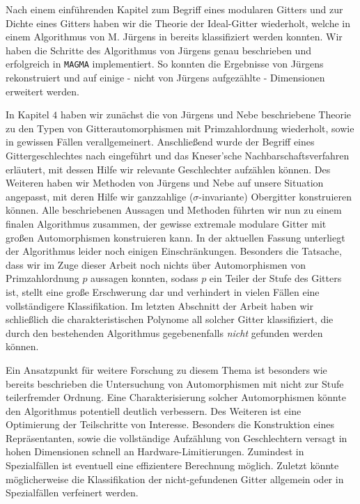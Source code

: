 \documentclass[12pt,a4paper,halfparskip,headsepline,bibtotocnumbered]{scrreprt}
\theoremstyle{nummermitklammern}
\theoremstyle{nonumberbreak}
\begin{document}
Nach einem einführenden Kapitel zum Begriff eines modularen Gitters und zur Dichte eines Gitters haben wir die Theorie der Ideal-Gitter wiederholt, welche in einem Algorithmus von M. Jürgens in \cite{juergens} bereits klassifiziert werden konnten. Wir haben die Schritte des Algorithmus von Jürgens genau beschrieben und erfolgreich in \texttt{MAGMA} implementiert. So konnten die Ergebnisse von Jürgens rekonstruiert und auf einige - nicht von Jürgens aufgezählte - Dimensionen erweitert werden.\par
In Kapitel $4$ haben wir zunächst die von Jürgens und Nebe beschriebene Theorie zu den Typen von Gitterautomorphismen mit Primzahlordnung wiederholt, sowie in gewissen Fällen verallgemeinert. Anschließend wurde der Begriff eines Gittergeschlechtes nach \cite{conway} eingeführt und das Kneser'sche Nachbarschaftsverfahren erläutert, mit dessen Hilfe wir relevante Geschlechter aufzählen können. Des Weiteren haben wir Methoden von Jürgens und Nebe auf unsere Situation angepasst, mit deren Hilfe wir ganzzahlige ($\sigma$-invariante) Obergitter konstruieren können. Alle beschriebenen Aussagen und Methoden führten wir nun zu einem finalen Algorithmus zusammen, der gewisse extremale modulare Gitter mit großen Automorphismen konstruieren kann. In der aktuellen Fassung unterliegt der Algorithmus leider noch einigen Einschränkungen. Besonders die Tatsache, dass wir im Zuge dieser Arbeit noch nichts über Automorphismen von Primzahlordnung $p$ aussagen konnten, sodass $p$ ein Teiler der Stufe des Gitters ist, stellt eine große Erschwerung dar und verhindert in vielen Fällen eine vollständigere Klassifikation. Im letzten Abschnitt der Arbeit haben wir schließlich die charakteristischen Polynome all solcher Gitter klassifiziert, die durch den bestehenden Algorithmus gegebenenfalls \textit{nicht} gefunden werden können.\par
Ein Ansatzpunkt für weitere Forschung zu diesem Thema ist besonders wie bereits beschrieben die Untersuchung von Automorphismen mit nicht zur Stufe teilerfremder Ordnung.  Eine Charakterisierung solcher Automorphismen könnte den Algorithmus potentiell deutlich verbessern. Des Weiteren ist eine Optimierung der Teilschritte von Interesse. Besonders die Konstruktion eines Repräsentanten, sowie die vollständige Aufzählung von Geschlechtern versagt in hohen Dimensionen schnell an Hardware-Limitierungen. Zumindest in Spezialfällen ist eventuell eine effizientere Berechnung möglich. Zuletzt könnte möglicherweise die Klassifikation der nicht-gefundenen Gitter allgemein oder in Spezialfällen verfeinert werden. 
\end{document}

